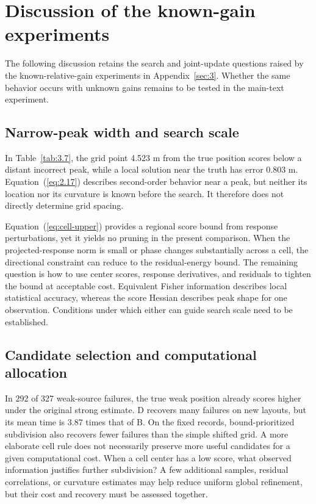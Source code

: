 \documentclass[11pt,a4paper]{article}
\numberwithin{equation}{section}
\numberwithin{figure}{section}
\numberwithin{table}{section}
\begin{document}
\section{Discussion of the known-gain experiments}\label{sec:4}

The following discussion retains the search and joint-update questions raised by the known-relative-gain experiments in Appendix~\ref{sec:3}. Whether the same behavior occurs with unknown gains remains to be tested in the main-text experiment.

\subsection{Narrow-peak width and search scale}\label{sec:4.1}

In Table~\ref{tab:3.7}, the grid point 4.523 m from the true position scores below a distant incorrect peak, while a local solution near the truth has error 0.803 m. Equation~(\ref{eq:2.17}) describes second-order behavior near a peak, but neither its location nor its curvature is known before the search. It therefore does not directly determine grid spacing.

Equation~(\ref{eq:cell-upper}) provides a regional score bound from response perturbations, yet it yields no pruning in the present comparison. When the projected-response norm is small or phase changes substantially across a cell, the directional constraint can reduce to the residual-energy bound. The remaining question is how to use center scores, response derivatives, and residuals to tighten the bound at acceptable cost. Equivalent Fisher information describes local statistical accuracy, whereas the score Hessian describes peak shape for one observation. Conditions under which either can guide search scale need to be established.

\subsection{Candidate selection and computational allocation}\label{sec:4.2}

In 292 of 327 weak-source failures, the true weak position already scores higher under the original strong estimate. D recovers many failures on new layouts, but its mean time is 3.87 times that of B. On the fixed records, bound-prioritized subdivision also recovers fewer failures than the simple shifted grid. A more elaborate cell rule does not necessarily preserve more useful candidates for a given computational cost. When a cell center has a low score, what observed information justifies further subdivision? A few additional samples, residual correlations, or curvature estimates may help reduce uniform global refinement, but their cost and recovery must be assessed together.
\end{document}
